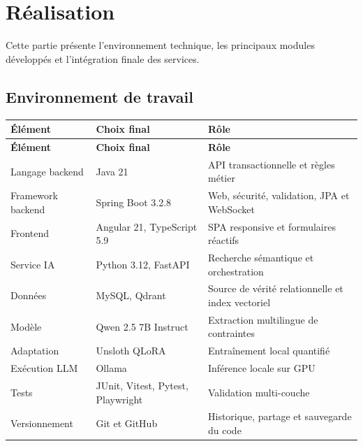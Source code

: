 \chapter{Réalisation}

Cette partie présente l'environnement technique, les principaux modules développés et l'intégration finale des services.


\section{Environnement de travail}

{\small\singlespacing{}
\begin{longtable}{|>{\raggedright\arraybackslash}p{}|>{\raggedright\arraybackslash}p{}|>{\raggedright\arraybackslash}p{}|}
\hline
\rowcolor{tablehead} \color{white}\bfseries Élément & \color{white}\bfseries Choix final & \color{white}\bfseries Rôle \\ \hline
\endfirsthead
\rowcolor{tablehead} \color{white}\bfseries Élément & \color{white}\bfseries Choix final & \color{white}\bfseries Rôle \\ \hline
\endhead
\hline\endfoot
Langage backend & Java 21 & API transactionnelle et règles métier \\ \hline
\rowcolor{tablerow} Framework backend & Spring Boot 3.2.8 & Web, sécurité, validation, JPA et WebSocket \\ \hline
Frontend & Angular 21, TypeScript 5.9 & SPA responsive et formulaires réactifs \\ \hline
\rowcolor{tablerow} Service IA & Python 3.12, FastAPI & Recherche sémantique et orchestration \\ \hline
Données & MySQL, Qdrant & Source de vérité relationnelle et index vectoriel \\ \hline
\rowcolor{tablerow} Modèle & Qwen 2.5 7B Instruct & Extraction multilingue de contraintes \\ \hline
Adaptation & Unsloth QLoRA & Entraînement local quantifié \\ \hline
\rowcolor{tablerow} Exécution LLM & Ollama & Inférence locale sur GPU \\ \hline
Tests & JUnit, Vitest, Pytest, Playwright & Validation multi-couche \\ \hline
\rowcolor{tablerow} Versionnement & Git et GitHub & Historique, partage et sauvegarde du code \\ \hline
\end{longtable}
}


